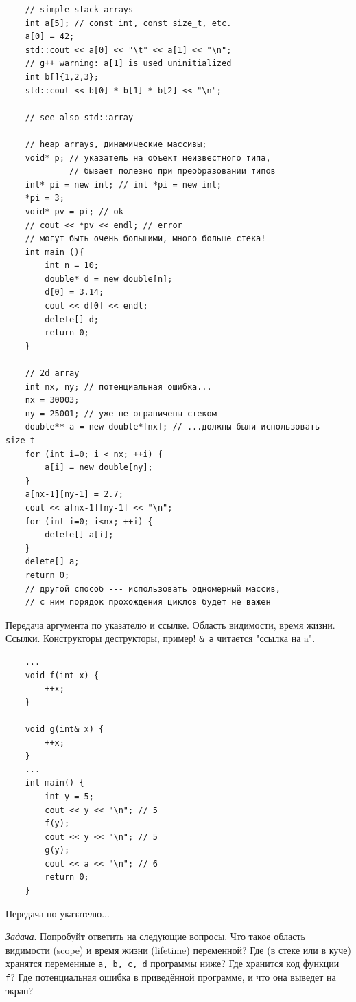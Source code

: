 \documentclass{book}
\begin{document}
\begin{verbatim}
    // simple stack arrays
    int a[5]; // const int, const size_t, etc.
    a[0] = 42;
    std::cout << a[0] << "\t" << a[1] << "\n";
    // g++ warning: a[1] is used uninitialized
    int b[]{1,2,3};
    std::cout << b[0] * b[1] * b[2] << "\n";

    // see also std::array

    // heap arrays, динамические массивы;
    void* p; // указатель на объект неизвестного типа,
             // бывает полезно при преобразовании типов
    int* pi = new int; // int *pi = new int;
    *pi = 3;
    void* pv = pi; // ok
    // cout << *pv << endl; // error
    // могут быть очень большими, много больше стека!
    int main (){
        int n = 10;
        double* d = new double[n];
        d[0] = 3.14;
        cout << d[0] << endl;
        delete[] d;
        return 0;
    }

    // 2d array
    int nx, ny; // потенциальная ошибка...
    nx = 30003;
    ny = 25001; // уже не ограничены стеком
    double** a = new double*[nx]; // ...должны были использовать size_t
    for (int i=0; i < nx; ++i) {
        a[i] = new double[ny];
    }
    a[nx-1][ny-1] = 2.7;
    cout << a[nx-1][ny-1] << "\n";
    for (int i=0; i<nx; ++i) {
        delete[] a[i];
    }
    delete[] a;
    return 0;
    // другой способ --- использовать одномерный массив,
    // с ним порядок прохождения циклов будет не важен
\end{verbatim}

Передача аргумента по указателю и ссылке. Область видимости, время жизни.
Ссылки. Конструкторы деструкторы, пример! \texttt{& a} читается "ссылка на a".
\begin{verbatim}
    ...
    void f(int x) {
        ++x; 
    }

    void g(int& x) {
        ++x; 
    }
    ... 
    int main() {
        int y = 5; 
        cout << y << "\n"; // 5 
        f(y); 
        cout << y << "\n"; // 5 
        g(y); 
        cout << a << "\n"; // 6
        return 0;
    }
\end{verbatim}
Передача по указателю...

{\it Задача}. Попробуйт ответить на следующие вопросы. Что такое область видимости
(scope) и время жизни (lifetime) переменной? Где (в стеке или в куче) хранятся переменные
\texttt{a, b, c, d} программы ниже? Где хранится код функции \texttt{f}? Где
потенциальная ошибка в приведённой программе, и что она выведет на экран?
\end{document}
